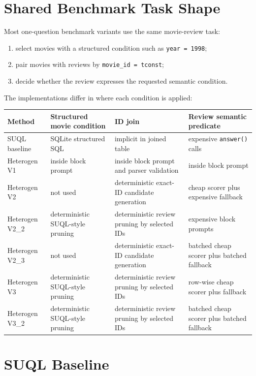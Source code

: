 \documentclass[11pt,oneside]{book}
\begin{document}
\chapter{Shared Benchmark Task Shape}
Most one-question benchmark variants use the same movie-review task:
\begin{enumerate}
\item select movies with a structured condition such as \texttt{year = 1998};
\item pair movies with reviews by \texttt{movie\_id = tconst};
\item decide whether the review expresses the requested semantic condition.
\end{enumerate}
The implementations differ in where each condition is applied:
\begin{center}
\small
\renewcommand{\arraystretch}{1.25}
\begin{longtable}{@{}>{\RaggedRight\arraybackslash}p{}>{\RaggedRight\arraybackslash}p{}>{\RaggedRight\arraybackslash}p{}>{\RaggedRight\arraybackslash}p{}@{}}
\toprule
\textbf{Method} & \textbf{Structured movie condition} & \textbf{ID join} & \textbf{Review semantic predicate} \\
\midrule
\endhead
SUQL baseline & SQLite structured SQL & implicit in joined table & expensive \texttt{answer()} calls \\
Heterogen V1 & inside block prompt & inside block prompt and parser validation & inside block prompt \\
Heterogen V2 & not used & deterministic exact-ID candidate generation & cheap scorer plus expensive fallback \\
Heterogen V2\_2 & deterministic SUQL-style pruning & deterministic review pruning by selected IDs & expensive block prompts \\
Heterogen V2\_3 & not used & deterministic exact-ID candidate generation & batched cheap scorer plus batched fallback \\
Heterogen V3 & deterministic SUQL-style pruning & deterministic review pruning by selected IDs & row-wise cheap scorer plus fallback \\
Heterogen V3\_2 & deterministic SUQL-style pruning & deterministic review pruning by selected IDs & batched cheap scorer plus batched fallback \\
\bottomrule
\end{longtable}
\end{center}
\chapter{SUQL Baseline}
\end{document}
